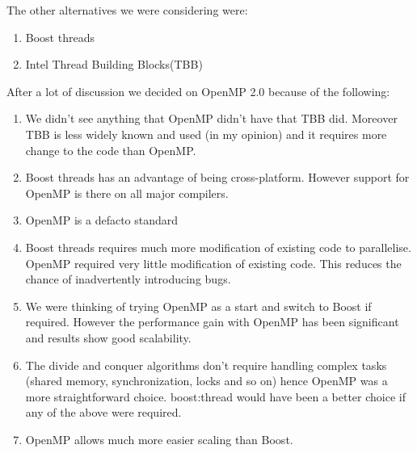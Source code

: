 The other alternatives we were considering were: 

\begin{enumerate}
\item Boost threads
\item Intel Thread Building Blocks(TBB)
\end{enumerate}

After a lot of discussion we decided on OpenMP 2.0 because of the
following:
\begin{enumerate}
\item We didn't see anything that OpenMP didn't have that TBB
  did. Moreover TBB is less widely known and used (in my opinion) and
  it requires more change to the code than OpenMP.
\item Boost threads has an advantage of being cross-platform. However
  support for OpenMP is there on all major compilers.
\item OpenMP is a defacto standard
\item Boost threads requires much more modification of existing code to parallelise. OpenMP required very little modification of existing code. This reduces the chance of inadvertently introducing bugs.
\item We were thinking of trying OpenMP as a start and switch to Boost if required. However the performance gain with OpenMP has been significant and results show good scalability.
\item The divide and conquer algorithms don't require handling complex tasks (shared memory, synchronization, locks and so on) hence OpenMP was a more straightforward choice. boost:thread would have been a better choice if any of the above were required.
\item OpenMP allows much more easier scaling than Boost.
\end{enumerate}
